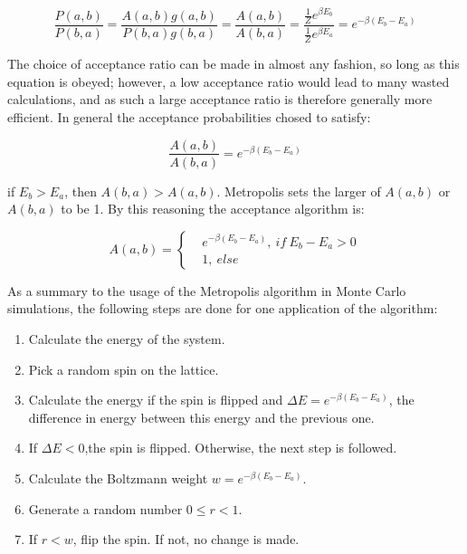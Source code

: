 \begin{equation}
\frac{P(a, b)}{P(b,a)} = \frac{A(a, b)g(a,b)}{P(b,a)g(b,a)}=\frac{A(a,b)}{A(b,a)} = \frac{\frac{1}{Z} e^{\beta E_b}}{\frac{1}{Z} e^{\beta E_a}}=e^{-\beta(E_b - E_a)}
\end{equation}

The choice of acceptance ratio can be made in almost any fashion, so long as this equation is obeyed; however, a low acceptance ratio would lead to many wasted calculations,
and as such a large acceptance ratio is therefore generally more efficient. In general the acceptance probabilities chosed to satisfy:

\begin{equation}
\frac{A(a,b)}{A(b,a)} = e^{-\beta(E_b - E_a)}
\end{equation}

if $E_b > E_a$, then $A(b,a) > A(a,b)$. Metropolis sets the larger of $A(a, b)$ or $A(b, a)$ to be 1. By this reasoning the acceptance algorithm is:

\begin{equation}
A(a,b) = 
  \left\{
    \begin{aligned}
      & e^{-\beta(E_b - E_a)}, \ if \ E_b - E_a > 0 \\
      & 1, \ else
    \end{aligned}
  \right.
\end{equation}

As a summary to the usage of the Metropolis algorithm in Monte Carlo simulations,
the following steps are done for one application of the algorithm:
\begin{enumerate}
\item Calculate the energy of the system.
\item Pick a random spin on the lattice.
\item Calculate the energy if the spin is flipped and $\Delta E = e^{-\beta(E_b - E_a)}$, the difference in energy between this energy and the previous one.
\item If $\Delta E < 0$,the spin is flipped. Otherwise, the next step is followed.
\item Calculate the Boltzmann weight $w = e^{-\beta(E_b - E_a)}$.
\item Generate a random number $0 \leq r < 1$.
\item If $r < w$, flip the spin. If not, no change is made.
\end{enumerate}


